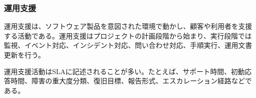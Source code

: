 \subsubsection{運用支援}

運用支援は、ソフトウェア製品を意図された環境で動かし、顧客や利用者を支援する活動である。運用支援はプロジェクトの計画段階から始まり、実行段階では監視、イベント対応、インシデント対応、問い合わせ対応、手順実行、運用文書更新を行う。

運用支援活動はSLAに記述されることが多い。たとえば、サポート時間、初動応答時間、障害の重大度分類、復旧目標、報告形式、エスカレーション経路などである。
